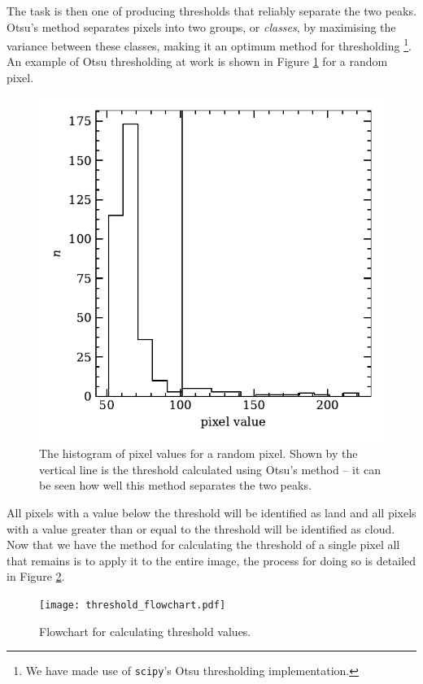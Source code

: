 The task is then one of producing thresholds that reliably separate the two
peaks. Otsu's method \citep{gonzalez2008} separates pixels into two groups, or
\emph{classes}, by maximising the variance between these classes, making it an
optimum method for thresholding \footnote{We have made use of \texttt{scipy}'s
  Otsu thresholding implementation.}. An example of Otsu thresholding at work is
shown in Figure \ref{fig:otsu} for a random pixel.
\begin{figure}
  \centering
    \includegraphics[width=0.8\linewidth]{figures/otsu_bimodal.pdf}
    \caption{The histogram of pixel values for a random pixel. Shown by the
      vertical line is the threshold calculated using Otsu's method -- it can be
      seen how well this method separates the two peaks.}
    \label{fig:otsu}
\end{figure}
All pixels with a value below the threshold will be identified as land and all
pixels with a value greater than or equal to the threshold will be identified
as cloud. Now that we have the method for calculating the threshold of a single
pixel all that remains is to apply it to the entire image, the process for doing
so is detailed in Figure \ref{fig:thr_fc}.
\begin{figure}[t!]
  \centering
  \texttt{[image: threshold\_flowchart.pdf]}
  \caption{Flowchart for calculating threshold values.}
  \label{fig:thr_fc}
\end{figure}

